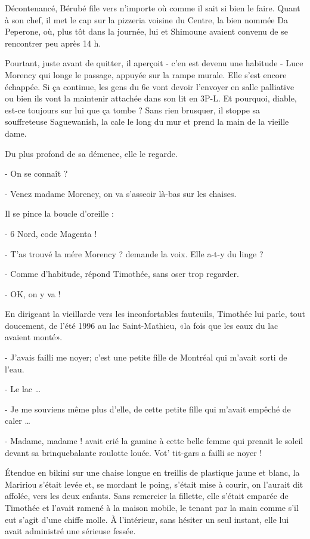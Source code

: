 Décontenancé, Bérubé file vers n’importe où comme il sait si bien le faire. Quant à son chef, il met le cap sur la pizzeria voisine du Centre, la bien nommée Da Peperone, où, plus tôt dans la journée, lui et Shimoune avaient convenu de se rencontrer peu après 14 h.

Pourtant, juste avant de quitter, il aperçoit - c’en est devenu une habitude - Luce Morency qui longe le passage, appuyée sur la rampe murale. Elle s’est encore échappée. Si ça continue, les gens du 6e vont devoir l’envoyer en salle palliative ou bien ils vont la maintenir attachée dans son lit en 3P-L. Et pourquoi, diable, est-ce toujours sur lui que ça tombe ? Sans rien brusquer, il stoppe sa souffreteuse Saguewanish, la cale le long du mur et prend la main de la vieille dame.

Du plus profond de sa démence, elle le regarde.

- On se connaît ?

- Venez madame Morency, on va s’asseoir là-bas sur les chaises.

Il se pince la boucle d’oreille :

- 6 Nord, code Magenta !

- T’as trouvé la mére Morency ? demande la voix. Elle a-t-y du linge ?

- Comme d’habitude, répond Timothée, sans oser trop regarder.

- OK, on y va !

En dirigeant la vieillarde vers les inconfortables fauteuils, Timothée lui parle, tout doucement, de l’été 1996 au lac Saint-Mathieu, «la fois que les eaux du lac avaient monté».

- J’avais failli me noyer; c’est une petite fille de Montréal qui m’avait sorti de l’eau.

- Le lac …

- Je me souviens même plus d’elle, de cette petite fille qui m’avait empêché de caler …

- Madame, madame ! avait crié la gamine à cette belle femme qui prenait le soleil devant sa brinquebalante roulotte louée. Vot’ tit-gars a failli se noyer !

Étendue en bikini sur une chaise longue en treillis de plastique jaune et blanc, la Maririou s’était levée et, se mordant le poing, s’était mise à courir, on l’aurait dit affolée, vers les deux enfants. Sans remercier la fillette, elle s’était emparée de Timothée et l’avait ramené à la maison mobile, le tenant par la main comme s’il eut s’agit d’une chiffe molle. À l’intérieur, sans hésiter un seul instant, elle lui avait administré une sérieuse fessée.


